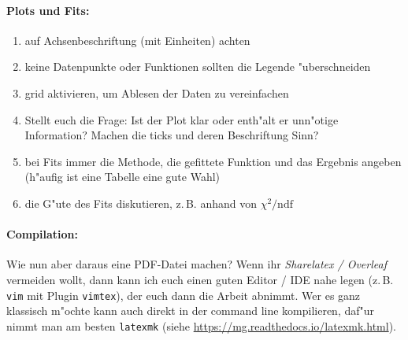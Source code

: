 \documentclass[11pt, a4paper]{article}
\begin{document}
	\paragraph{Plots und Fits:}
	\begin{enumerate}[label=(\Roman*)]
	 	\item auf Achsenbeschriftung (mit Einheiten) achten
	 	\item keine Datenpunkte oder Funktionen sollten die Legende "uberschneiden
	 	\item grid aktivieren, um Ablesen der Daten zu vereinfachen
        \item Stellt euch die Frage: Ist der Plot klar oder enth"alt er unn"otige Information? Machen die ticks und deren Beschriftung Sinn?
        \item bei Fits immer die Methode, die gefittete Funktion und das Ergebnis angeben (h"aufig ist eine Tabelle eine gute Wahl)
	 	\item die G"ute des Fits diskutieren, z.\,B. anhand von $\chi^2/\mathrm{ndf}$
	 \end{enumerate}

     \paragraph{Compilation:} Wie nun aber daraus eine PDF-Datei machen? Wenn ihr \emph{Sharelatex / Overleaf} vermeiden wollt, dann kann ich euch einen guten Editor / IDE nahe legen (z.\,B. \texttt{vim} mit Plugin \texttt{vimtex}), der euch dann die Arbeit abnimmt. Wer es ganz klassisch m"ochte kann auch direkt in der command line kompilieren, daf"ur nimmt man am besten \texttt{latexmk} (siehe \url{https://mg.readthedocs.io/latexmk.html}).

	 \printbibliography[title = {Literatur}]
\end{document}
